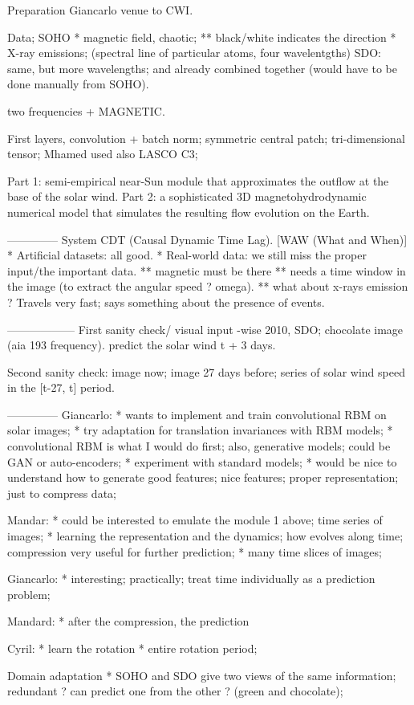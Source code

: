 Preparation Giancarlo venue to CWI.

Data; 
SOHO
* magnetic field, chaotic;
** black/white indicates the direction
* X-ray emissions; (spectral line of particular atoms, four wavelentgths)
SDO: same, but more wavelengths; and already combined together (would have to be done manually from SOHO).

two frequencies + MAGNETIC.

First layers, 
convolution + batch norm;
symmetric central patch; tri-dimensional tensor; 
Mhamed used also LASCO C3; 

Part 1: semi-empirical near-Sun module that approximates the outflow at the base of the solar wind.
Part 2: a sophisticated 3D magnetohydrodynamic numerical model that simulates the resulting flow evolution on the Earth.

--------------
System CDT (Causal Dynamic Time Lag).
[WAW (What and When)]
* Artificial datasets: all good.
* Real-world data: we still miss the proper input/the important data.
** magnetic must be there
** needs a time window in the image (to extract the angular speed ? omega).
** what about x-rays emission ? Travels very fast; says something about the presence of events.

------------------
First sanity check/ visual input -wise
2010, SDO; chocolate image (aia 193 frequency).
predict the solar wind t + 3 days.

Second sanity check:
image now; image 27 days before; series of solar wind speed in the [t-27, t] period.

--------------
Giancarlo:
* wants to implement and train convolutional RBM on solar images;
* try adaptation for translation invariances with RBM models; 
* convolutional RBM is what I would do first; also, generative models; could be GAN or auto-encoders;
* experiment with standard models; 
* would be nice to understand how to generate good features; nice features; proper representation; just to compress data;

Mandar:
* could be interested to emulate the module 1 above; time series of images;  
* learning the representation and the dynamics; how evolves along time; compression very useful for further prediction;
* many time slices of images; 

Giancarlo:
* interesting; practically; treat time individually as a prediction problem; 

Mandard:
* after the compression, the prediction

Cyril:
* learn the rotation
* entire rotation period; 

Domain adaptation
* SOHO and SDO give two views of the same information; redundant ? can predict one from the other ? (green and chocolate); 






